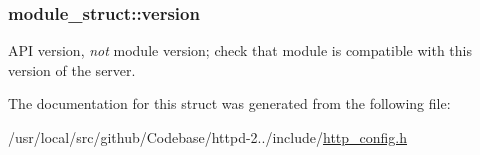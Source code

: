 \subsubsection[{\texorpdfstring{version}{version}}]{ module\+\_\+struct\+::version}\hypertarget{structmodule__struct_a9fe73d6d2e8c6e3a0cfa0b7f14a1fcef}{}\label{structmodule__struct_a9fe73d6d2e8c6e3a0cfa0b7f14a1fcef}
A\+PI version, {\itshape not} module version; check that module is compatible with this version of the server. 

The documentation for this struct was generated from the following file\+:\begin{DoxyCompactItemize}
\item 
/usr/local/src/github/\+Codebase/httpd-\/2../include/\hyperlink{http__config_8h}{http\+\_\+config.\+h}\end{DoxyCompactItemize}
